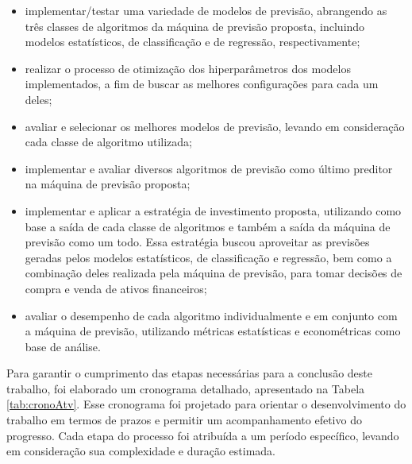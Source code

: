 \begin{itemize}
    \item implementar/testar uma variedade de modelos de previsão, abrangendo as três classes de algoritmos da máquina de previsão proposta, incluindo modelos estatísticos, de classificação e de regressão, respectivamente;

    \item realizar o processo de otimização dos hiperparâmetros dos modelos implementados, a fim de buscar as melhores configurações para cada um deles;

    \item avaliar e selecionar os melhores modelos de previsão, levando em consideração cada classe de algoritmo utilizada;

    \item implementar e avaliar diversos algoritmos de previsão como último preditor na máquina de previsão proposta;

    \item implementar e aplicar a estratégia de investimento proposta, utilizando como base a saída de cada classe de algoritmos e também a saída da máquina de previsão como um todo. Essa estratégia buscou aproveitar as previsões geradas pelos modelos estatísticos, de classificação e regressão, bem como a combinação deles realizada pela máquina de previsão, para tomar decisões de compra e venda de ativos financeiros;

    \item avaliar o desempenho de cada algoritmo individualmente e em conjunto com a máquina de previsão, utilizando métricas estatísticas e econométricas como base de análise.
\end{itemize}

Para garantir o cumprimento das etapas necessárias para a conclusão deste trabalho, foi elaborado um cronograma detalhado, apresentado na Tabela \ref{tab:cronoAtv}. Esse cronograma foi projetado para orientar o desenvolvimento do trabalho em termos de prazos e permitir um acompanhamento efetivo do progresso. Cada etapa do processo foi atribuída a um período específico, levando em consideração sua complexidade e duração estimada. 


